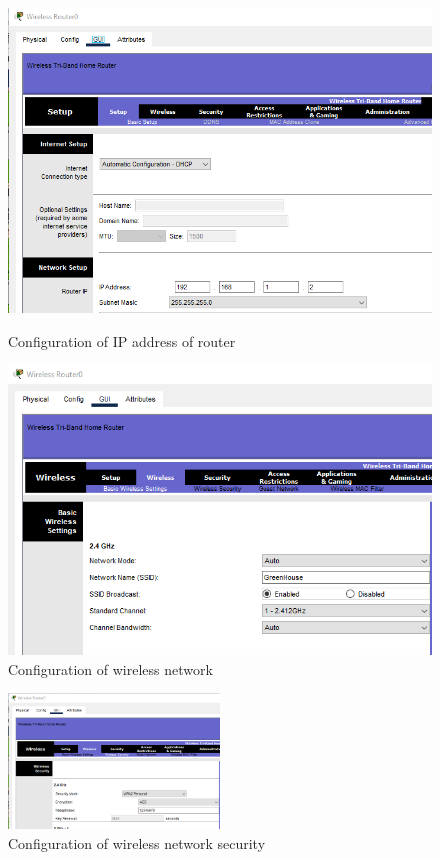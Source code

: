 \documentclass{report}
\begin{document}
\begin{figure}[h]
    \centering
    
    \begin{minipage}{0.45\textwidth}
    \centering
    \includegraphics[width=1\textwidth]{Hr/1h.png}
    \caption{Configuration of IP address of router}
    \label{fig:5}
    \end{minipage}
    \hfill
    \begin{minipage}{0.45\textwidth}
    \centering
    \includegraphics[width=1\textwidth]{Hr/2h.png}
    \caption{Configuration of wireless network}
    \label{fig:6}
    \end{minipage} 
      
\end{figure}
\newpage
\begin{figure}[h]
   
    \centering
    \includegraphics[width=0.50\textwidth]{Hr/3h.png}
    \caption{Configuration of wireless network security}
    \label{fig:7}
   
\end{figure}
\end{document}
